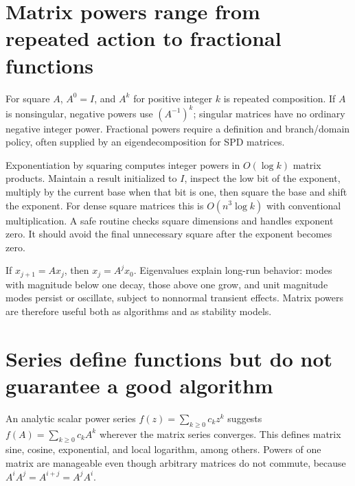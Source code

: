 \section{Matrix powers range from repeated action to fractional functions}\label{02-foundations-ii-ch026-matrix-powers-range-from-repeated-action-to-fractional-functions}

\hypertarget{02-foundations-ii-ch026-matrix-powers-range-from-repeated-action-to-fractional-functions}{}

For square \(A\), \(A^0=I\), and \(A^k\) for positive integer \(k\) is repeated composition. If \(A\) is nonsingular, negative powers use \((A^{-1})^k\); singular matrices have no ordinary negative integer power. Fractional powers require a definition and branch/domain policy, often supplied by an eigendecomposition for SPD matrices.

Exponentiation by squaring computes integer powers in \(O(\log k)\) matrix products. Maintain a result initialized to \(I\), inspect the low bit of the exponent, multiply by the current base when that bit is one, then square the base and shift the exponent. For dense square matrices this is \(O(n^3\log k)\) with conventional multiplication. A safe routine checks square dimensions and handles exponent zero. It should avoid the final unnecessary square after the exponent becomes zero.

If \(x_{j+1}=Ax_j\), then \(x_j=A^jx_0\). Eigenvalues explain long-run behavior: modes with magnitude below one decay, those above one grow, and unit magnitude modes persist or oscillate, subject to nonnormal transient effects. Matrix powers are therefore useful both as algorithms and as stability models.

\section{Series define functions but do not guarantee a good algorithm}\label{02-foundations-ii-ch026-series-define-functions-but-do-not-guarantee-a-good-algorithm}

\hypertarget{02-foundations-ii-ch026-series-define-functions-but-do-not-guarantee-a-good-algorithm}{}

An analytic scalar power series \(f(z)=\sum_{k\ge0}c_kz^k\) suggests \(f(A)=\sum_{k\ge0}c_kA^k\) wherever the matrix series converges. This defines matrix sine, cosine, exponential, and local logarithm, among others. Powers of one matrix are manageable even though arbitrary matrices do not commute, because \(A^iA^j=A^{i+j}=A^jA^i\).

